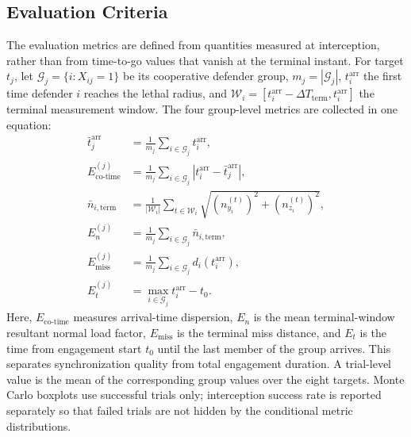 \subsection{Evaluation Criteria}
\label{subsec:eval}

The evaluation metrics are defined from quantities measured at interception, rather than from
time-to-go values that vanish at the terminal instant. For target $t_j$, let
$\mathcal G_j=\{i:X_{ij}=1\}$ be its cooperative defender group,
$m_j=|\mathcal G_j|$, $t_i^{\mathrm{arr}}$ the first time defender $i$ reaches the lethal
radius, and $\mathcal W_i=[t_i^{\mathrm{arr}}-\Delta T_{\mathrm{term}},
t_i^{\mathrm{arr}}]$ the terminal measurement window. The four group-level metrics are
collected in one equation:
\begin{equation}
\label{eq:evaluation_metrics}
\begin{aligned}
\bar t_j^{\mathrm{arr}}
 &=\frac{1}{m_j}\sum_{i\in\mathcal G_j}t_i^{\mathrm{arr}},\\
E_{\mathrm{co\text{-}time}}^{(j)}
 &=\frac{1}{m_j}\sum_{i\in\mathcal G_j}
 \left|t_i^{\mathrm{arr}}-\bar t_j^{\mathrm{arr}}\right|,\\
\bar n_{i,\mathrm{term}}
 &=\frac{1}{|\mathcal W_i|}\sum_{t\in\mathcal W_i}
 \sqrt{(n_{y_i}^{(t)})^2+(n_{z_i}^{(t)})^2},\\
E_n^{(j)}
 &=\frac{1}{m_j}\sum_{i\in\mathcal G_j}
 \bar n_{i,\mathrm{term}},\\
E_{\mathrm{miss}}^{(j)}
 &=\frac{1}{m_j}\sum_{i\in\mathcal G_j}d_i(t_i^{\mathrm{arr}}),\\
E_t^{(j)}&=\max_{i\in\mathcal G_j}t_i^{\mathrm{arr}}-t_0.
\end{aligned}
\end{equation}
Here, $E_{\mathrm{co\text{-}time}}$ measures arrival-time dispersion,
$E_n$ is the mean terminal-window resultant normal load factor, $E_{\mathrm{miss}}$ is the terminal miss
distance, and $E_t$ is the time from engagement start $t_0$ until the last member of the group
arrives. This separates synchronization quality from total engagement duration. A trial-level
value is the mean of the corresponding group values over the eight targets. Monte Carlo
boxplots use successful trials only; interception success rate is reported separately so that
failed trials are not hidden by the conditional metric distributions.
